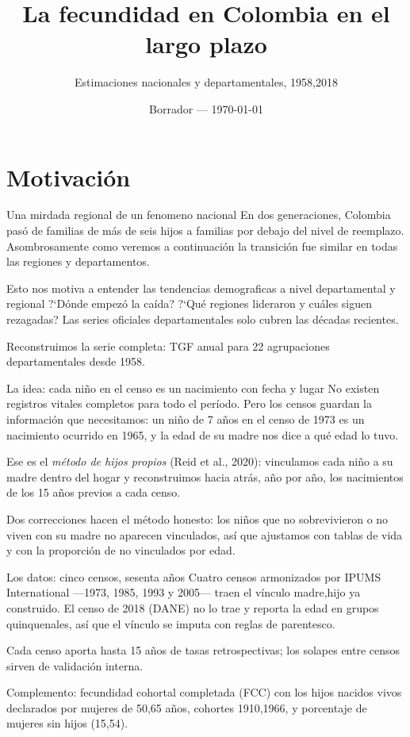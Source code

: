 \documentclass[11pt,aspectratio=169]{beamer}
\title{La fecundidad en Colombia en el largo plazo}
\subtitle{Estimaciones nacionales y departamentales, 1958,2018}
\institute{Centro de Estudios Econ\'omicos Regionales (CEER)\\ Banco de la Rep\'ublica}
\date{Borrador — \today}
\begin{document}
\maketitle


\section{Motivaci\'on}

\begin{frame}{Una mirdada regional de un fenomeno nacional}
En dos generaciones, Colombia pas\'o de familias de m\'as de seis hijos
a familias por debajo del nivel de reemplazo. Asombrosamente como veremos a continuación la transición fue similar en todas las regiones y departamentos.
\bigskip

Esto nos motiva a entender las tendencias demograficas a nivel departamental y regional  ?`D\'onde empez\'o la ca\'ida? ?`Qu\'e regiones
lideraron y cu\'ales siguen rezagadas? Las series oficiales
departamentales solo cubren las d\'ecadas recientes.
\bigskip

\alert{Reconstruimos la serie completa: TGF anual para 22
agrupaciones departamentales desde 1958.}
\end{frame}

\begin{frame}{La idea: cada ni\~no en el censo es un nacimiento con fecha y lugar}
No existen registros vitales completos para todo el per\'iodo. Pero los
censos guardan la informaci\'on que necesitamos: un ni\~no de 7 a\~nos
en el censo de 1973 es un nacimiento ocurrido en 1965, y la edad de su
madre nos dice a qu\'e edad lo tuvo.
\bigskip

Ese es el \emph{m\'etodo de hijos propios} (Reid et al., 2020):
vinculamos cada ni\~no a su madre dentro del hogar y reconstruimos
hacia atr\'as, a\~no por a\~no, los nacimientos de los 15 a\~nos
previos a cada censo.
\bigskip

Dos correcciones hacen el m\'etodo honesto: los ni\~nos que \alert{no
sobrevivieron} o \alert{no viven con su madre} no aparecen vinculados,
as\'i que ajustamos con tablas de vida y con la proporci\'on de no
vinculados por edad.
\end{frame}

\begin{frame}{Los datos: cinco censos, sesenta a\~nos}
Cuatro censos armonizados por IPUMS International —1973, 1985, 1993 y
2005— traen el v\'inculo madre,hijo ya construido. El censo de 2018
(DANE) no lo trae y reporta la edad en grupos quinquenales, as\'i que
el v\'inculo se imputa con reglas de parentesco.
\bigskip

Cada censo aporta hasta 15 a\~nos de tasas retrospectivas; los solapes
entre censos sirven de \alert{validaci\'on interna}.
\bigskip

{\small Complemento: fecundidad cohortal completada (FCC) con los hijos
nacidos vivos declarados por mujeres de 50,65 a\~nos, cohortes
1910,1966, y porcentaje de mujeres sin hijos (15,54).}
\end{frame}
\end{document}
